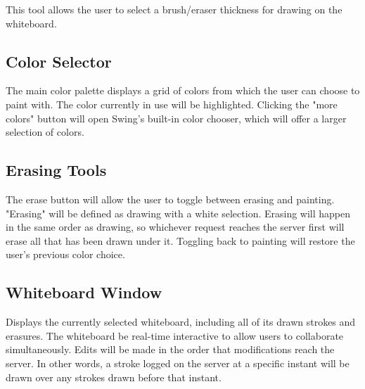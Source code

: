 This tool allows the user to select a brush/eraser thickness for drawing on the whiteboard.

\subsection{Color Selector}

The main color palette displays a grid of colors from which the user can choose to paint with. The color currently in use will be highlighted. Clicking the "more colors" button will open Swing's built-in color chooser, which will offer a larger selection of colors.

\subsection{Erasing Tools}

The erase button will allow the user to toggle between erasing and painting. "Erasing" will be defined as drawing with a white selection. Erasing will happen in the same order as drawing, so whichever request reaches the server first will erase all that has been drawn under it. Toggling back to painting will restore the user's previous color choice.

\subsection{Whiteboard Window}

Displays the currently selected whiteboard, including all of its drawn strokes and erasures. The whiteboard be real-time interactive to allow users to collaborate simultaneously. Edits will be made in the order that modifications reach the server. In other words, a stroke logged on the server at a specific instant will be drawn over any strokes drawn before that instant.